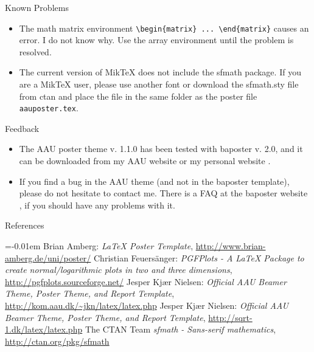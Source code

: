 \documentclass[a0paper,portrait]{baposter}
\begin{document}
\begin{poster}
\begin{posterbox}[name=problems,column=2,below=install]{Known Problems}
  \begin{itemize}
    \item The math matrix environment {\tt \textbackslash begin\{matrix\} ... \textbackslash end\{matrix\}} causes an error. I do not know why. Use the array environment until the problem is resolved.
    \item The current version of MikTeX does not include the sfmath package. If you are a MikTeX user, please use another font or download the sfmath.sty file from ctan \cite{ctan} and place the file in the same folder as the poster file {\tt aauposter.tex}.
  \end{itemize}
\end{posterbox}

\begin{posterbox}[name=feedback,column=2,below=problems]{Feedback}
  \begin{itemize}
    \item The AAU poster theme v. 1.1.0 has been tested with baposter v. 2.0, and it can be downloaded from my AAU website \cite{jknaau} or my personal website \cite{jknsqrt-1}.
    \item If you find a bug in the AAU theme (and not in the baposter template), please do not hesitate to contact me. There is a FAQ at the baposter website \cite{baposter}, if you should have any problems with it.
  \end{itemize}
\end{posterbox}

\begin{posterbox}[name=refs,column=2,below=feedback,above=bottom]{References}


\begin{thebibliography}{1}%
\itemsep=-0.01em%
\setlength{\baselineskip}{0.4em}%
 Brian Amberg: \emph{LaTeX Poster Template}, \url{http://www.brian-amberg.de/uni/poster/} 
 Christian Feuersänger: \emph{PGFPlots - A LaTeX Package to create normal/logarithmic plots in two and three dimensions}, \url{http://pgfplots.sourceforge.net/} 
 Jesper Kjær Nielsen: \emph{Official AAU Beamer Theme, Poster Theme, and Report Template}, \url{http://kom.aau.dk/~jkn/latex/latex.php}
 Jesper Kjær Nielsen: \emph{Official AAU Beamer Theme, Poster Theme, and Report Template}, \url{http://sqrt-1.dk/latex/latex.php}
 The CTAN Team  \emph{sfmath -  Sans-serif mathematics}, \url{http://ctan.org/pkg/sfmath}
\end{thebibliography}


%  
%   
\end{posterbox}

\end{poster}
\end{document}
